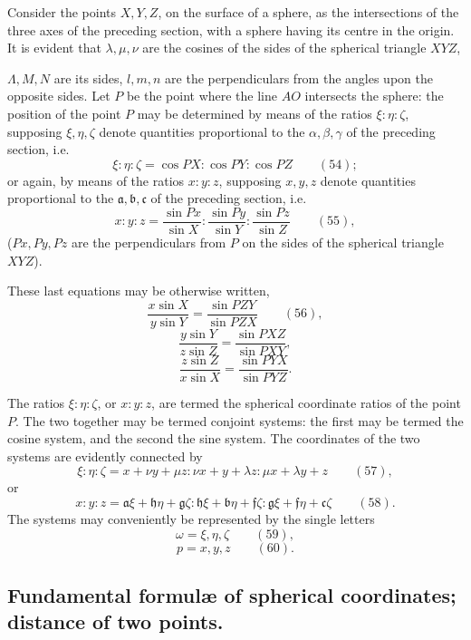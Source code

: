 \documentclass[11pt]{article}
\begin{document}
Consider the points $X, Y, Z$, on the surface of a sphere, as the intersections of the three axes of the preceding section, with a sphere having its centre in the origin. It is evident that $\lambda, \mu, \nu$ are the cosines of the sides of the spherical triangle $XYZ$,

\newpage
\setcounter{page}{218}

$\Lambda, M, N$ are its sides, $l, m, n$ are the perpendiculars from the angles upon the opposite sides. Let $P$ be the point where the line $AO$ intersects the sphere: the position of the point $P$ may be determined by means of the ratios $\xi : \eta : \zeta$, supposing $\xi, \eta, \zeta$ denote quantities proportional to the $\alpha, \beta, \gamma$ of the preceding section, i.e.
\[
\xi : \eta : \zeta = \cos PX : \cos PY : \cos PZ \qquad (54);
\]
or again, by means of the ratios $x : y : z$, supposing $x, y, z$ denote quantities proportional to the $\mathfrak{a}, \mathfrak{b}, \mathfrak{c}$ of the preceding section, i.e.
\[
x : y : z = \frac{\sin Px}{\sin X} : \frac{\sin Py}{\sin Y} : \frac{\sin Pz}{\sin Z} \qquad (55),
\]
($Px, Py, Pz$ are the perpendiculars from $P$ on the sides of the spherical triangle $XYZ$).

These last equations may be otherwise written,
\[
\frac{x\sin X}{y\sin Y} = \frac{\sin PZY}{\sin PZX} \qquad (56),
\]
\[
\frac{y\sin Y}{z\sin Z} = \frac{\sin PXZ}{\sin PXY},
\]
\[
\frac{z\sin Z}{x\sin X} = \frac{\sin PYX}{\sin PYZ}.
\]

The ratios $\xi : \eta : \zeta$, or $x : y : z$, are termed the spherical coordinate ratios of the point $P$. The two together may be termed conjoint systems: the first may be termed the cosine system, and the second the sine system. The coordinates of the two systems are evidently connected by
\[
\xi : \eta : \zeta = x + \nu y + \mu z : \nu x + y + \lambda z : \mu x + \lambda y + z \qquad (57),
\]
or
\[
x : y : z = \mathfrak{a}\xi + \mathfrak{h}\eta + \mathfrak{g}\zeta : \mathfrak{h}\xi + \mathfrak{b}\eta + \mathfrak{f}\zeta : \mathfrak{g}\xi + \mathfrak{f}\eta + \mathfrak{c}\zeta \qquad (58).
\]
The systems may conveniently be represented by the single letters
\[
\omega = \xi, \eta, \zeta \qquad (59),
\]
\[
p = x, y, z \qquad (60).
\]

\subsection*{Fundamental formul\ae{} of spherical coordinates; distance of two points.}
\end{document}
